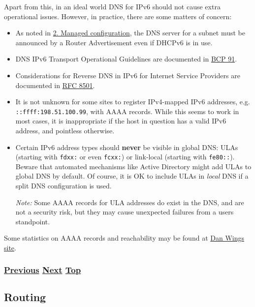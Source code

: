 \documentclass[
]{article}
\begin{document}
Apart from this, in an ideal world DNS for IPv6 should not cause extra
operational issues. However, in practice, there are some matters of
concern:

\begin{itemize}
\item
  As noted in \hyperref[managed-configuration]{2. Managed
  configuration}, the DNS server for a subnet must be announced by a
  Router Advertisement even if DHCPv6 is in use.
\item
  DNS IPv6 Transport Operational Guidelines are documented in
  \href{https://www.rfc-editor.org/info/bcp91}{BCP 91}.
\item
  Considerations for Reverse DNS in IPv6 for Internet Service Providers
  are documented in \href{https://www.rfc-editor.org/info/rfc8501}{RFC
  8501}.
\item
  It is not unknown for some sites to register IPv4-mapped IPv6
  addresses, e.g. \texttt{::ffff:198.51.100.99}, with AAAA records.
  While this seems to work in most cases, it is inappropriate if the
  host in question has a valid IPv6 address, and pointless otherwise.
\item
  Certain IPv6 address types should \textbf{never} be visible in global
  DNS: ULAs (starting with \texttt{fdxx:} or even \texttt{fcxx:}) or
  link-local (starting with \texttt{fe80::}). Beware that automated
  mechanisms like Active Directory might add ULAs to global DNS by
  default. Of course, it is OK to include ULAs in \emph{local} DNS if a
  split DNS configuration is used.

  \emph{Note:} Some AAAA records for ULA addresses do exist in the DNS,
  and are not a security risk, but they may cause unexpected failures
  from a user\textquotesingle s standpoint.
\end{itemize}

Some statistics on AAAA records and reachability may be found at
\href{https://www.employees.org/~dwing/aaaa-stats/}{Dan
Wing\textquotesingle s site}.

\subsubsection{\texorpdfstring{\hyperref[managed-configuration]{Previous}
\hyperref[routing]{Next}
\hyperref[ipv6-basic-technology]{Top}}{Previous Next Top}}\label{previous-next-top-14}

\pagebreak

\subsection{Routing}\label{routing}
\end{document}
